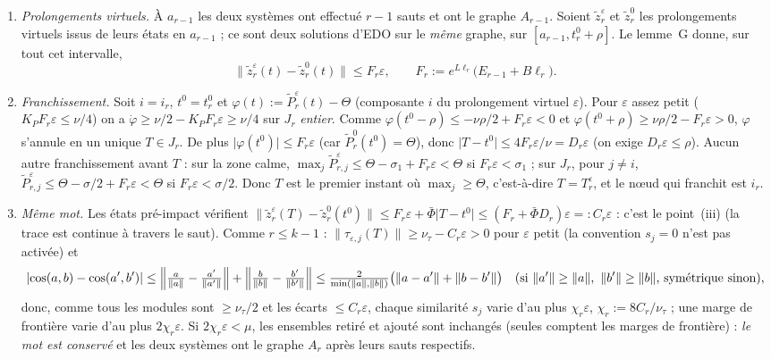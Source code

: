 \documentclass[11pt,a4paper]{article}
\theoremstyle{remark}
\theoremstyle{definition}
\newcommand{\norm}[1]{\lVert #1\rVert}
\newcommand{\eps}{\varepsilon}
\newcommand{\zt}{\widetilde z}
\newcommand{\Pt}{\widetilde P}
\begin{document}
\begin{enumerate}[label=(\alph*)]
\item \emph{Prolongements virtuels.} À $a_{r-1}$ les deux systèmes ont effectué $r-1$ sauts et ont le graphe $A_{r-1}$. Soient $\zt^\eps_r$ et $\zt^0_r$ les prolongements virtuels issus de leurs états en $a_{r-1}$ ; ce sont deux solutions d'EDO sur le \emph{même} graphe, sur $[a_{r-1},t_r^0+\rho]$. Le lemme~G donne, sur tout cet intervalle,
\[
\norm{\zt^\eps_r(t)-\zt^0_r(t)}\le F_r\eps,\qquad F_r:=e^{L\ell_r}\bigl(E_{r-1}+B\ell_r\bigr).
\]
\item \emph{Franchissement.} Soit $i=i_r$, $t^0=t_r^0$ et $\varphi(t):=\Pt^\eps_{r}(t)-\Theta$ (composante $i$ du prolongement virtuel $\eps$). Pour $\eps$ assez petit ($K_PF_r\eps\le\nu/4$) on a $\dot\varphi\ge\nu/2-K_PF_r\eps\ge\nu/4$ sur $J_r$ \emph{entier}. Comme $\varphi(t^0-\rho)\le-\nu\rho/2+F_r\eps<0$ et $\varphi(t^0+\rho)\ge\nu\rho/2-F_r\eps>0$, $\varphi$ s'annule en un unique $T\in J_r$. De plus $\lvert\varphi(t^0)\rvert\le F_r\eps$ (car $\Pt^0_r(t^0)=\Theta$), donc $\lvert T-t^0\rvert\le 4F_r\eps/\nu=D_r\eps$ (on exige $D_r\eps\le\rho$).
 Aucun autre franchissement avant $T$ : sur la zone calme, $\max_j\Pt^\eps_{r,j}\le\Theta-\sigma_1+F_r\eps<\Theta$ si $F_r\eps<\sigma_1$ ; sur $J_r$, pour $j\ne i$, $\Pt^\eps_{r,j}\le\Theta-\sigma/2+F_r\eps<\Theta$ si $F_r\eps<\sigma/2$. Donc $T$ est le premier instant où $\max_j\ge\Theta$, c'est-à-dire $T=T_r^\eps$, et le n\oe ud qui franchit est $i_r$.
\item \emph{Même mot.} Les états pré-impact vérifient $\norm{\zt^\eps_r(T)-\zt^0_r(t^0)}\le F_r\eps+\bar\Phi\lvert T-t^0\rvert\le(F_r+\bar\Phi D_r)\eps=:C_r\eps$ : c'est le point~(iii) (la trace est continue à travers le saut). Comme $r\le k-1$ : $\norm{\tau_{\eps,j}(T)}\ge\nu_\tau-C_r\eps>0$ pour $\eps$ petit (la convention $s_j=0$ n'est pas activée) et
 \[
 \lvert\cos(a,b)-\cos(a',b')\rvert\le\Bigl\lVert\tfrac a{\norm a}-\tfrac{a'}{\norm{a'}}\Bigr\rVert+\Bigl\lVert\tfrac b{\norm b}-\tfrac{b'}{\norm{b'}}\Bigr\rVert\le\tfrac2{\min(\norm a,\norm b)}\bigl(\norm{a-a'}+\norm{b-b'}\bigr)\quad(\text{si }\norm{a'}\ge\norm a,\ \norm{b'}\ge\norm b\text{, symétrique sinon}),
 \]
 donc, comme tous les modules sont $\ge\nu_\tau/2$ et les écarts $\le C_r\eps$, chaque similarité $s_j$ varie d'au plus $\chi_r\eps$, $\chi_r:=8C_r/\nu_\tau$ ; une marge de frontière varie d'au plus $2\chi_r\eps$. Si $2\chi_r\eps<\mu$, les ensembles retiré et ajouté sont inchangés (seules comptent les marges de frontière) : \emph{le mot est conservé} et les deux systèmes ont le graphe $A_r$ après leurs sauts respectifs.

\end{enumerate}
\end{document}
